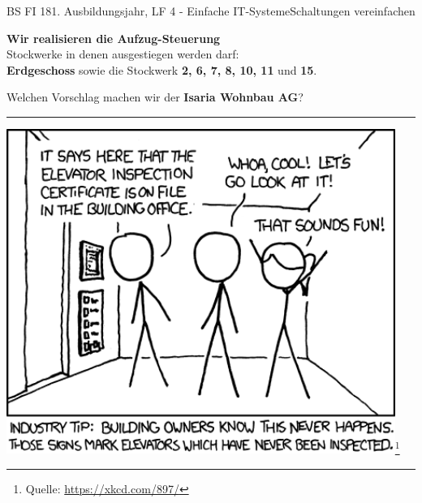 \documentclass[oneside,openany,headings=optiontotoc,11pt,numbers=noenddot]{scrreprt}
\begin{document}
	\thispagestyle{plain}
	\begin{worksheet}{BS FI 18}{1. Ausbildungsjahr, LF 4 - Einfache IT-Systeme}{Schaltungen vereinfachen}
		\begin{framed}
			\noindent
			\begin{minipage}{0.58\textwidth}
				\textbf{Wir realisieren die Aufzug-Steuerung}\\
				Stockwerke in denen ausgestiegen werden darf:\\
				\textbf{Erdgeschoss} sowie die Stockwerk \textbf{2, 6, 7, 8, 10, 11} und \textbf{15}.
				\par
				\begin{addmargin}[0.75cm]{0cm}
					Welchen Vorschlag machen wir der \textbf{Isaria Wohnbau AG}?\\
					\par\bigskip\noindent
					\rule{0.9\textwidth}{0.1pt}
				\end{addmargin}
			\end{minipage}
			\hfill
			\begin{minipage}{0.4\textwidth}
				\includegraphics[width=0.95\textwidth]{../99_Bilder/aufzug.png}\footnote{Quelle: \url{https://xkcd.com/897/}}
			\end{minipage}
		\end{framed}
		\begin{framed}

\end{framed}
\end{worksheet}
\end{document}
